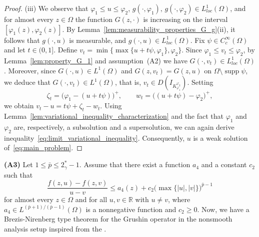 \documentclass[11pt]{article}
\begin{document}
\begin{proof}
\medskip

\textnormal{(iii)} We observe that $\varphi_1 \le u \le \varphi_2$, $g(\cdot,\varphi_1),\, g(\cdot,\varphi_2) \in L_{loc}^{1}(\Omega)$, and for almost every $z \in \Omega$ the function $G(z,\cdot)$ is increasing on the interval $[\varphi_1(z), \varphi_2(z)]$. 
By Lemma~\ref{lem:measurability_properties_G_g}\textnormal{(ii)}, it follows that $g(\cdot,u)$ is measurable, and $g(\cdot,u) \in L_{loc}^{1}(\Omega)$.
Fix $\psi \in C_c^{\infty}(\Omega)$ and let $t \in (0,1]$. Define $v_t = \min\{ \max \{ u + t \psi , \varphi_1\},\varphi_2\}$. Since $\varphi_1 \le v_t \le \varphi_2$, by Lemma~\ref{lem:property_G_1} and assumption~\textnormal{(A2)} we have $G(\cdot,v_t) \in L_{loc}^{1}(\Omega)$. Moreover, since $G(\cdot,u) \in L^{1}(\Omega)$ and $G(z,v_t) = G(z,u)$ on $\Omega \setminus \operatorname{supp}\psi$, we deduce that $G(\cdot,v_t) \in L^{1}(\Omega)$, that is, $v_t \in D(I_{K_{\varphi_1}^{\varphi_2}})$.
Setting
\begin{equation*}
\zeta_t = \bigl( \varphi_1 - (u + t\psi) \bigr)^{+},
\qquad
w_t = \bigl( (u + t\psi) - \varphi_2 \bigr)^{+},
\end{equation*}
we obtain $v_t - u = t\psi + \zeta_t - w_t$. Using Lemma~\ref{lem:variational_inequality_characterization} and the fact that $\varphi_1$ and $\varphi_2$ are, respectively, a subsolution and a supersolution, we can again derive inequality~\eqref{eq:limit_variational_inequality}. Consequently, $u$ is a weak solution of~\eqref{eq:main_problem}.
\end{proof}

\textbf{(A3)} Let $1 \le \bar{p} \le 2^{*}_{\gamma} - 1$. 
Assume that there exist a function $a_4$ and a constant $c_2$ such that
\begin{equation*}
\frac{f(z,u) - f(z,v)}{u - v}
\le a_4(z) + c_2 \bigl( \max \{ |u|, |v|\} \bigr)^{\bar{p}-1}
\end{equation*}
for almost every $z \in \Omega$ and for all $u, v \in \mathbb{R}$ with $u \ne v$, where $a_4 \in L^{(\bar{p}+1)/(\bar{p}-1)}(\Omega)$ is a nonnegative function and $c_2 \geq 0$.
Now, we have a Brezis-Nirenberg type theorem for the Grushin operator in the nonsmooth analysis setup inspired from the \cite[Theorem $3$]{hirano_concave_convex}.
\end{document}
